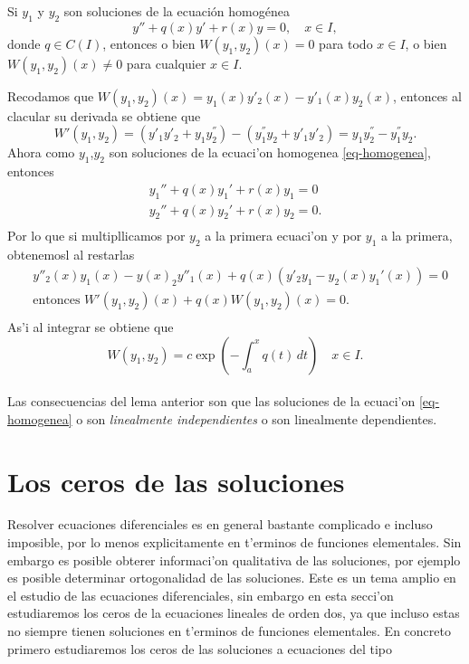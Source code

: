 \documentclass[main.tex]{subfiles}
\begin{document}
\begin{lema}
Si \(y_1\) y \(y_2\) son soluciones de la ecuación homogénea
\begin{equation}\label{eq-homogenea}
y'' + q(x) y' + r(x) y = 0, \quad x \in I,
\end{equation}
donde \( q \in C(I) \), entonces o bien \( W(y_1, y_2)(x) = 0 \) para todo \( x \in I \), o bien \( W(y_1, y_2)(x) \neq 0 \) para cualquier \( x \in I \).
\end{lema}
\dem Recodamos que \(W(y_{1},y_{2})(x)=y_{1}(x)y'_{2}(x)-y'_{1}(x)y_{2}(x)\), entonces al clacular su derivada se obtiene que
\[
  W'(y_{1},y_{2})=(y'_{1}y'_{2}+y_{1}y^{''}_{2})-(y^{''}_{1}y_{2}+y'_{1}y'_{2})=y_{1}y^{''}_{2}-y^{''}_{1}y_{2}.
\]
Ahora como \(y_{1}\),\(y_{2}\) son soluciones de la ecuaci'on homogenea \ref{eq-homogenea}, entonces
\begin{align*}
  y_1'' + q(x) y_1' + r(x) y_1 = 0\\
  y_2'' + q(x) y_2' + r(x) y_2 = 0.\\
\end{align*}
Por lo que si multipllicamos por \(y_{2}\) a la primera ecuaci'on y por \(y_{1}\) a la primera, obtenemosl al restarlas
\begin{align*}
  & y''_{2}(x)y_1(x)-y(x)_{2}y''_1(x) + q(x)(y'_{2}y_1-y_{2}(x)y_1'(x))=0\\
  &\text{entonces } W'(y_{1},y_{2})(x) + q(x)W(y_{1},y_{2})(x)= 0.\\
\end{align*}
As'i al integrar se obtiene que
\[
  W(y_{1},y_{2})=c\exp\left(-\int_{a}^{x}q(t)\,dt\right)\quad x\in I.
\]
\QED\\
\obs Las consecuencias del lema anterior son que las soluciones de la ecuaci'on \ref{eq-homogenea} o son \emph{linealmente independientes} o son linealmente dependientes.
\section{Los ceros de las soluciones}
\noindent Resolver ecuaciones diferenciales es en general bastante complicado e incluso imposible, por lo menos explicitamente en t'erminos de funciones elementales. Sin embargo es posible obterer informaci'on qualitativa de las soluciones, por ejemplo es posible determinar ortogonalidad de las soluciones. Este es un tema amplio en el estudio de las ecuaciones diferenciales, sin embargo en esta secci'on estudiaremos los ceros de la ecuaciones lineales de orden dos, ya que incluso estas no siempre tienen soluciones en t'erminos de funciones elementales. En concreto primero estudiaremos los ceros de las soluciones a ecuaciones del tipo
\end{document}
